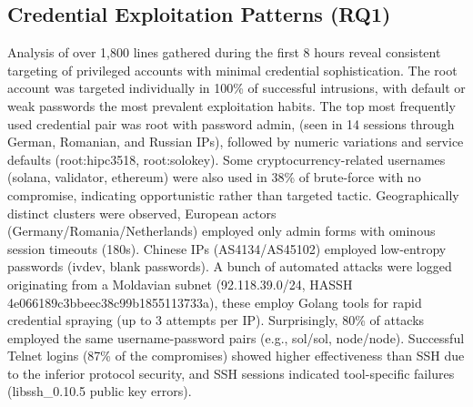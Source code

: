 \documentclass{cls/ULBreport}
\begin{document}
\subsection{Credential Exploitation Patterns (RQ1)}
Analysis of over 1,800 lines gathered during the first 8 hours reveal consistent targeting of privileged accounts with minimal credential sophistication. The root account was targeted individually in 100{\%} of successful intrusions, with default or weak passwords the most prevalent exploitation habits. The top most frequently used credential pair was root with password admin, (seen in 14 sessions through German, Romanian, and Russian IPs), followed by numeric variations and service defaults (root:hipc3518, root:solokey). Some cryptocurrency-related usernames (solana, validator, ethereum) were also used in 38{\%} of brute-force with no compromise, indicating opportunistic rather than targeted tactic. Geographically distinct clusters were observed, European actors (Germany/Romania/Netherlands) employed only admin forms with ominous session timeouts (180s). Chinese IPs (AS4134/AS45102) employed low-entropy passwords (ivdev, blank passwords). A bunch of automated attacks were logged originating from a Moldavian subnet (92.118.39.0/24, HASSH 4e066189c3bbeec38c99b1855113733a), these employ Golang tools for rapid credential spraying (up to 3 attempts per IP). Surprisingly, 80{\%} of attacks employed the same username-password pairs (e.g., sol/sol, node/node). Successful Telnet logins (87{\%} of the compromises) showed higher effectiveness than SSH due to the inferior protocol security, and SSH sessions indicated tool-specific failures (libssh\_0.10.5 public key errors).
\end{document}
